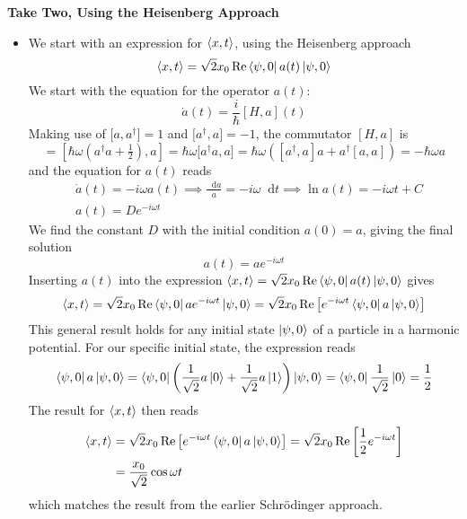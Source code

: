 \documentclass[11pt, a4paper]{article}
\newcommand{\diff}{\mathop{}\!\mathrm{d}} %
\newcommand{\Schro}{Schr\"{o}dinger\xspace}
\begin{document}
\textbf{Take Two, Using the Heisenberg Approach}
\begin{itemize}
	\item We start with an expression for $ \ev{x, t} $, using the Heisenberg approach
	\begin{equation*}
		\ev{x, t} = \sqrt{2}x_{0} \Re \bra{\psi, 0}a(t) \ket{\psi, 0}
	\end{equation*}
	We start with the equation for the operator $ a(t) $: 
	\begin{equation*}
		\dot{a}(t) = \frac{i}{\hbar}[H, a](t)
	\end{equation*}
	Making use of $ \big[a, a^{\dagger}\big] = 1 $ and $ \big[ a^{\dagger}, a\big] = -1 $, the commutator $ [H, a] $ is
	\begin{equation*}
		[H, a] = [\hbar \omega (a^{\dagger}a + \tfrac{1}{2}), a] = \hbar \omega \big[a^{\dagger}a, a\big] = \hbar \omega \left([a^{\dagger}, a]a + a^{\dagger}[a, a]\right) = -\hbar \omega a
	\end{equation*}
	and the equation for $ a(t) $ reads
	\begin{align*}
		&\dot{a}(t) = -i \omega a(t) \implies \frac{\diff a}{a} = -i\omega \diff t \implies \ln a(t) = -i\omega t + C\\
		&a(t) = De^{-i\omega t}
	\end{align*}
	We find the constant $ D $ with the initial condition $ a(0) = a $, giving the final solution 
	\begin{equation*}
		a(t) = ae^{-i\omega t}
	\end{equation*}
	Inserting $ a(t) $ into the expression $ \ev{x, t} = \sqrt{2}x_{0} \Re \bra{\psi, 0}a(t) \ket{\psi, 0} $ gives
	\begin{equation*}
		\ev{x, t} = \sqrt{2}x_{0} \Re \bra{\psi, 0}ae^{-i\omega t} \ket{\psi, 0} = \sqrt{2}x_{0} \Re \left[e^{-i\omega t} \bra{\psi, 0}a \ket{\psi, 0}\right]
	\end{equation*}
	This general result holds for any initial state $ \ket{\psi, 0} $ of a particle in a harmonic potential. For our specific initial state, the expression reads
	\begin{equation*}
		\bra{\psi, 0}a \ket{\psi, 0} = 	\bra{\psi, 0} \left(\frac{1}{\sqrt{2}}a \ket{0} + \frac{1}{\sqrt{2}}a\ket{1} \right) \ket{\psi, 0}  =	\bra{\psi, 0} \frac{1}{\sqrt{2}} \ket{0} = \frac{1}{2}
	\end{equation*}
	The result for $ \ev{x, t} $ then reads
	\begin{align*}
		\ev{x, t} &= \sqrt{2}x_{0} \Re \left[e^{-i\omega t} \bra{\psi, 0}a \ket{\psi, 0}\right] = \sqrt{2}x_{0} \Re \left[\frac{1}{2} e^{-i\omega t}\right]\\
		&=\frac{x_{0}}{\sqrt{2}}\cos \omega t
	\end{align*}
	which matches the result from the earlier \Schro approach. 
\end{itemize}
\end{document}
